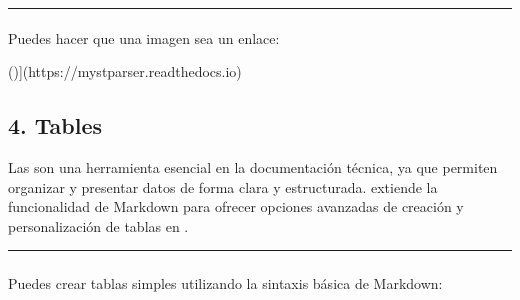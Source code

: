 \documentclass[a4paper,10pt,spanish]{sphinxmanual}
\begin{document}
\bigskip\hrule\bigskip



\paragraph{}
\label{\detokenize{configuracion_inicial/013.guia_de_myst_parser:enlazar-imagenes}}
\sphinxAtStartPar
Puedes hacer que una imagen sea un enlace:

\begin{sphinxVerbatim}[commandchars=\\\{\}]
[\PYG{n+nt}{![Logo de MyST}]()](https://myst\PYGZhy{}parser.readthedocs.io)
\end{sphinxVerbatim}

\sphinxAtStartPar
{}

\sphinxAtStartPar
{}


\subsection{4. Tables}
\label{\detokenize{configuracion_inicial/013.guia_de_myst_parser:tables}}
\sphinxAtStartPar
Las  son una herramienta esencial en la documentación técnica, ya que permiten organizar y presentar datos de forma clara y estructurada.  extiende la funcionalidad de Markdown para ofrecer opciones avanzadas de creación y personalización de tablas en .


\bigskip\hrule\bigskip



\subsubsection{}
\label{\detokenize{configuracion_inicial/013.guia_de_myst_parser:tablas-basicas-en-myst-parser}}

\paragraph{}
\label{\detokenize{configuracion_inicial/013.guia_de_myst_parser:sintaxis-basica-de-tablas-markdown}}
\sphinxAtStartPar
Puedes crear tablas simples utilizando la sintaxis básica de Markdown:
\end{document}
